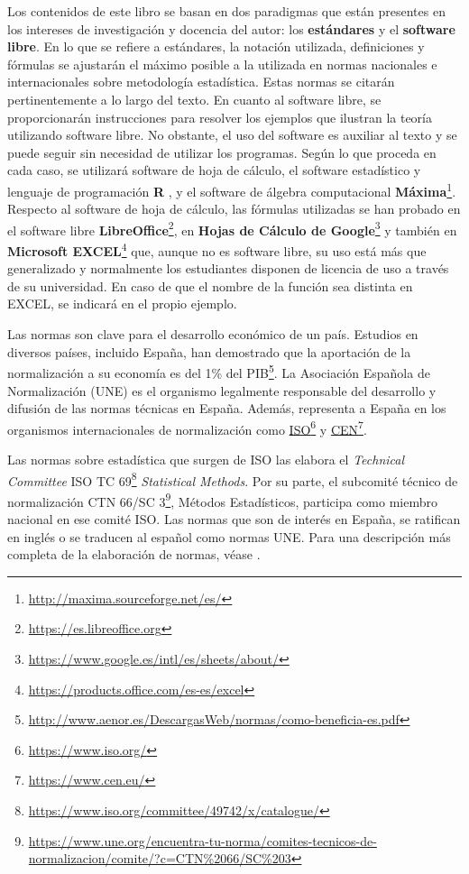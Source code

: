 \documentclass[
]{book}
\begin{document}
Los contenidos de este libro se basan en dos paradigmas que están presentes
en los intereses de investigación y docencia del autor: los \textbf{estándares} y
el \textbf{software libre}. En lo que se refiere a estándares, la notación utilizada,
definiciones y fórmulas se ajustarán el máximo posible a la utilizada en normas
nacionales e internacionales sobre metodología estadística. Estas normas se
citarán pertinentemente a lo largo del texto. En cuanto al software libre,
se proporcionarán instrucciones para resolver los ejemplos
que ilustran la teoría utilizando software libre.
No obstante, el uso del software es
auxiliar al texto y se puede seguir sin necesidad de utilizar
los programas. Según lo que proceda en cada caso, se utilizará
software de hoja de cálculo, el software estadístico y lenguaje de
programación
\textbf{R} \citep{R-base},
y el software de álgebra computacional \textbf{Máxima}\footnote{\url{http://maxima.sourceforge.net/es/}}.
Respecto al software de hoja de cálculo, las fórmulas utilizadas se han probado
en el software libre \textbf{LibreOffice}\footnote{\url{https://es.libreoffice.org}}, en \textbf{Hojas de Cálculo de Google}\footnote{\url{https://www.google.es/intl/es/sheets/about/}} y
también en \textbf{Microsoft EXCEL}\footnote{\url{https://products.office.com/es-es/excel}} que,
aunque no es software libre, su uso
está más que generalizado y normalmente los estudiantes disponen de licencia de uso
a través de su universidad. En caso de que el nombre de la función sea distinta
en EXCEL, se indicará en el propio ejemplo.

Las normas son clave para el desarrollo económico de un país. Estudios en diversos países,
incluido España, han demostrado que la aportación de la normalización a su economía es del 1\% del PIB\footnote{\url{http://www.aenor.es/DescargasWeb/normas/como-beneficia-es.pdf}}. La
Asociación Española de Normalización (UNE) es el organismo legalmente
responsable del desarrollo y difusión de las normas técnicas en España.
Además, representa a España en los organismos internacionales de normalización como
\href{https://www.iso.org/}{ISO}\footnote{\url{https://www.iso.org/}} y \href{https://www.cen.eu/}{CEN}\footnote{\url{https://www.cen.eu/}}.

Las normas sobre estadística que surgen de ISO las elabora el \emph{Technical Committee}
ISO TC 69\footnote{\url{https://www.iso.org/committee/49742/x/catalogue/}} \emph{Statistical Methods}.
Por su parte, el subcomité técnico de normalización
CTN 66/SC 3\footnote{\url{https://www.une.org/encuentra-tu-norma/comites-tecnicos-de-normalizacion/comite/?c=CTN\%2066/SC\%203}}, Métodos Estadísticos,
participa como miembro nacional en ese comité ISO.
Las normas que son de interés en España, se ratifican en inglés o se traducen
al español como normas UNE. Para una descripción más completa de la elaboración
de normas, véase \citet{cano2015qcr}.
\end{document}
